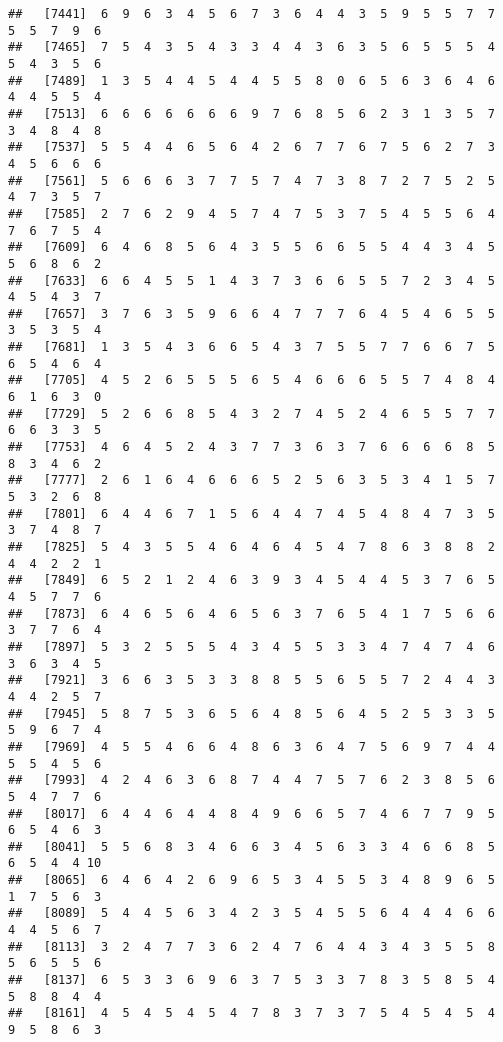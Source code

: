 \documentclass[
]{book}
\begin{document}
\begin{verbatim}
##   [7441]  6  9  6  3  4  5  6  7  3  6  4  4  3  5  9  5  5  7  7  5  5  7  9  6
##   [7465]  7  5  4  3  5  4  3  3  4  4  3  6  3  5  6  5  5  5  4  5  4  3  5  6
##   [7489]  1  3  5  4  4  5  4  4  5  5  8  0  6  5  6  3  6  4  6  4  4  5  5  4
##   [7513]  6  6  6  6  6  6  6  9  7  6  8  5  6  2  3  1  3  5  7  3  4  8  4  8
##   [7537]  5  5  4  4  6  5  6  4  2  6  7  7  6  7  5  6  2  7  3  4  5  6  6  6
##   [7561]  5  6  6  6  3  7  7  5  7  4  7  3  8  7  2  7  5  2  5  4  7  3  5  7
##   [7585]  2  7  6  2  9  4  5  7  4  7  5  3  7  5  4  5  5  6  4  7  6  7  5  4
##   [7609]  6  4  6  8  5  6  4  3  5  5  6  6  5  5  4  4  3  4  5  5  6  8  6  2
##   [7633]  6  6  4  5  5  1  4  3  7  3  6  6  5  5  7  2  3  4  5  4  5  4  3  7
##   [7657]  3  7  6  3  5  9  6  6  4  7  7  7  6  4  5  4  6  5  5  3  5  3  5  4
##   [7681]  1  3  5  4  3  6  6  5  4  3  7  5  5  7  7  6  6  7  5  6  5  4  6  4
##   [7705]  4  5  2  6  5  5  5  6  5  4  6  6  6  5  5  7  4  8  4  6  1  6  3  0
##   [7729]  5  2  6  6  8  5  4  3  2  7  4  5  2  4  6  5  5  7  7  6  6  3  3  5
##   [7753]  4  6  4  5  2  4  3  7  7  3  6  3  7  6  6  6  6  8  5  8  3  4  6  2
##   [7777]  2  6  1  6  4  6  6  6  5  2  5  6  3  5  3  4  1  5  7  5  3  2  6  8
##   [7801]  6  4  4  6  7  1  5  6  4  4  7  4  5  4  8  4  7  3  5  3  7  4  8  7
##   [7825]  5  4  3  5  5  4  6  4  6  4  5  4  7  8  6  3  8  8  2  4  4  2  2  1
##   [7849]  6  5  2  1  2  4  6  3  9  3  4  5  4  4  5  3  7  6  5  4  5  7  7  6
##   [7873]  6  4  6  5  6  4  6  5  6  3  7  6  5  4  1  7  5  6  6  3  7  7  6  4
##   [7897]  5  3  2  5  5  5  4  3  4  5  5  3  3  4  7  4  7  4  6  3  6  3  4  5
##   [7921]  3  6  6  3  5  3  3  8  8  5  5  6  5  5  7  2  4  4  3  4  4  2  5  7
##   [7945]  5  8  7  5  3  6  5  6  4  8  5  6  4  5  2  5  3  3  5  5  9  6  7  4
##   [7969]  4  5  5  4  6  6  4  8  6  3  6  4  7  5  6  9  7  4  4  5  5  4  5  6
##   [7993]  4  2  4  6  3  6  8  7  4  4  7  5  7  6  2  3  8  5  6  5  4  7  7  6
##   [8017]  6  4  4  6  4  4  8  4  9  6  6  5  7  4  6  7  7  9  5  6  5  4  6  3
##   [8041]  5  5  6  8  3  4  6  6  3  4  5  6  3  3  4  6  6  8  5  6  5  4  4 10
##   [8065]  6  4  6  4  2  6  9  6  5  3  4  5  5  3  4  8  9  6  5  1  7  5  6  3
##   [8089]  5  4  4  5  6  3  4  2  3  5  4  5  5  6  4  4  4  6  6  4  4  5  6  7
##   [8113]  3  2  4  7  7  3  6  2  4  7  6  4  4  3  4  3  5  5  8  5  6  5  5  6
##   [8137]  6  5  3  3  6  9  6  3  7  5  3  3  7  8  3  5  8  5  4  5  8  8  4  4
##   [8161]  4  5  4  5  4  5  4  7  8  3  7  3  7  5  4  5  4  5  4  9  5  8  6  3

\end{verbatim}
\end{document}
